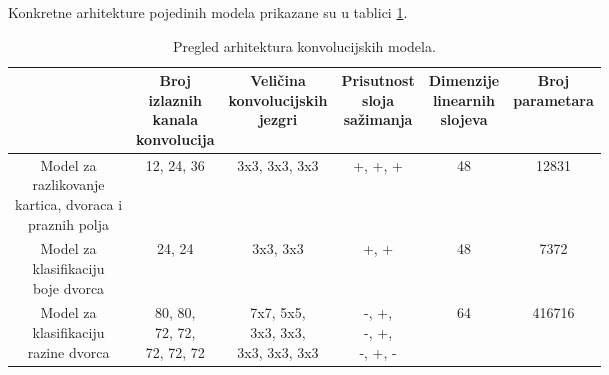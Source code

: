 \documentclass[diplomskirad]{fer}
\begin{document}
			Konkretne arhitekture pojedinih modela prikazane su u tablici \ref{tab:cnn_arhitekture}.
			
			\begin{table}[htb]
				\centering
				\caption{Pregled arhitektura konvolucijskih modela.}
				\label{tab:cnn_arhitekture}
				
				\begin{adjustbox}{width=0.94\textwidth}
					\begin{tabular}{cccccc}
						\toprule
						\makecell{\textbf{Model}} &
						\makecell{\textbf{Broj}\\\textbf{izlaznih}\\\textbf{kanala}\\\textbf{konvolucija}} &
						\makecell{\textbf{Veličina}\\\textbf{konvolucijskih}\\\textbf{jezgri}} &
						\makecell{\textbf{Prisutnost}\\\textbf{sloja}\\\textbf{sažimanja}} &
						\makecell{\textbf{Dimenzije}\\\textbf{linearnih}\\\textbf{slojeva}} &
						\makecell{\textbf{Broj}\\\textbf{parametara}} \\ 
						\midrule
						
						\makecell{Model za\\razlikovanje\\kartica, dvoraca i\\praznih polja}
						& 12, 24, 36 & 3x3, 3x3, 3x3 & +, +, + & 48 & 12831 \\[9mm]
						
						\makecell{Model za\\klasifikaciju\\boje dvorca}
						& 24, 24 & 3x3, 3x3 & +, + & 48 & 7372 \\[9mm]
						
						\makecell{Model za\\klasifikaciju\\razine dvorca}
						& \makecell{80, 80,\\72, 72,\\72, 72, 72} & \makecell{7x7, 5x5,\\3x3, 3x3,\\3x3, 3x3, 3x3} & \makecell{-, +,\\-, +,\\-, +, -} & 64 & 416716 \\[9mm]
						

\end{tabular}
\end{adjustbox}
\end{table}
\end{document}
